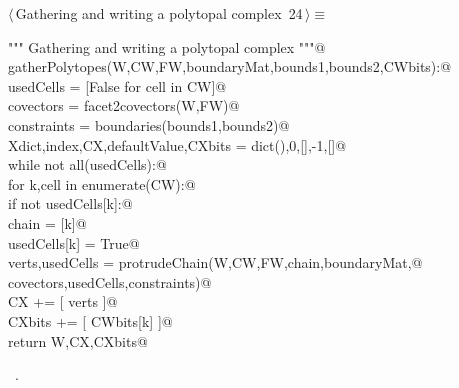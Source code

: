 \documentclass[11pt,oneside]{article}	%
\begin{document}
\begin{flushleft} \small \label{scrap31}
\protect{}$\langle\,$Gathering and writing a polytopal complex\nobreak\ {\footnotesize 24}$\,\rangle\equiv$
\vspace{-1ex}
\begin{list}{}{} \item
\mbox{}\verb@""" Gathering and writing a polytopal complex """@\\
\mbox{}\verb@def gatherPolytopes(W,CW,FW,boundaryMat,bounds1,bounds2,CWbits):@\\
\mbox{}\verb@   usedCells = [False for cell in CW]@\\
\mbox{}\verb@   covectors = facet2covectors(W,FW)@\\
\mbox{}\verb@   constraints = boundaries(bounds1,bounds2)@\\
\mbox{}\verb@   Xdict,index,CX,defaultValue,CXbits = dict(),0,[],-1,[]@\\
\mbox{}\verb@   while not all(usedCells):@\\
\mbox{}\verb@      for k,cell in enumerate(CW):@\\
\mbox{}\verb@         if not usedCells[k]:@\\
\mbox{}\verb@            chain = [k]@\\
\mbox{}\verb@            usedCells[k] = True@\\
\mbox{}\verb@            verts,usedCells = protrudeChain(W,CW,FW,chain,boundaryMat,@\\
\mbox{}\verb@                           covectors,usedCells,constraints)@\\
\mbox{}\verb@            CX += [ verts ]@\\
\mbox{}\verb@            CXbits += [ CWbits[k] ]@\\
\mbox{}\verb@   return W,CX,CXbits@\\
\mbox{}\verb@@{\NWsep}
\end{list}
\vspace{-1ex}
\footnotesize\addtolength{\baselineskip}{-1ex}
\begin{list}{}{\setlength{\itemsep}{-\parsep}\setlength{\itemindent}{-\leftmargin}}
\item \NWtxtMacroRefIn\ .
\end{list}
\end{flushleft}
\end{document}
